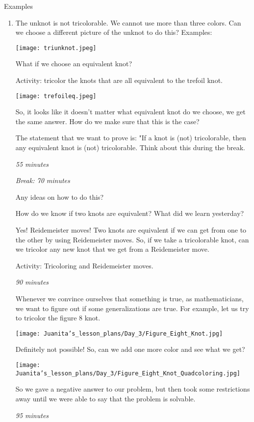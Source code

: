 \documentclass[12pt,letterpaper]{article}
\begin{document}
	Examples
	\begin{enumerate}
	    \item The unknot is not tricolorable. We cannot use more than three colors. Can we choose a different picture of the unknot to do this?
	    Examples:
	    
	    \texttt{[image: triunknot.jpeg]}
	    
	    
	    What if we choose an equivalent knot?
	    
	    Activity: tricolor the knots that are all equivalent to the trefoil knot.
	    
	    \texttt{[image: trefoileq.jpeg]}
	    
	    So, it looks like it doesn't matter what equivalent knot do we choose, we get the same answer. How do we make sure that this is the case?
	    
	    The statement that we want to prove is: "If a knot is (not) tricolorable, then any equivalent knot is (not) tricolorable. Think about this during the break.
	    
	    \textit{55 minutes}
	    
	    \textit{Break: 70 minutes}
	    
	    Any ideas on how to do this?
	    
	    How do we know if two knots are equivalent? What did we learn yesterday?
	    
	    Yes! Reidemeister moves! Two knots are equivalent if we can get from one to the other by using Reidemeister moves. So, if we take a tricolorable knot, can we tricolor any new knot that we get from a Reidemeister move.
	    
	    Activity: Tricoloring and Reidemeister moves.
	    
	    \textit{90 minutes}
	    
	    
	    Whenever we convince ourselves that something is true, as mathematicians, we want to figure out if some generalizations are true. For example, let us try to tricolor the figure 8 knot.
	    
	    \texttt{[image: Juanita's\_lesson\_plans/Day\_3/Figure\_Eight\_Knot.jpg]}
	    
	    Definitely not possible! So, can we add one more color and see what we get?
	    
	    \texttt{[image: Juanita's\_lesson\_plans/Day\_3/Figure\_Eight\_Knot\_Quadcoloring.jpg]}
        	    
	    So we gave a negative answer to our problem, but then took some restrictions away until we were able to say that the problem is solvable.
	    
	    \textit{95 minutes}
	    
	    
	\end{enumerate}
\end{document}
